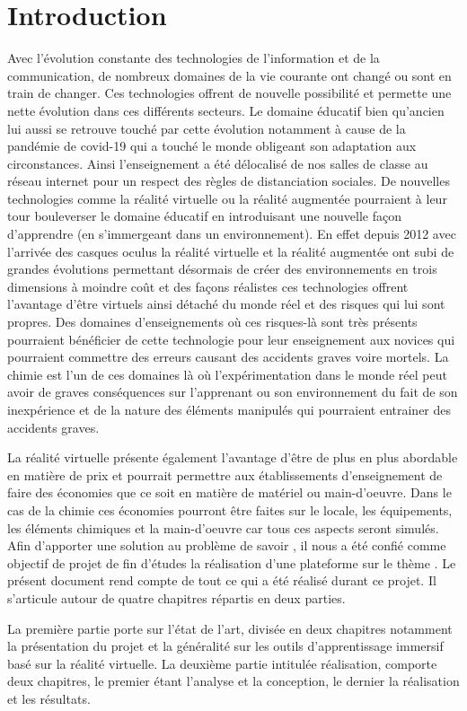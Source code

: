 \chapter*{Introduction}         %

Avec l'évolution constante des technologies de l'information et de la communication, de nombreux domaines de la vie courante ont changé ou sont en train de changer.
Ces technologies offrent de nouvelle possibilité et permette une nette évolution dans ces différents secteurs.
Le domaine éducatif bien qu'ancien lui aussi se retrouve touché par cette évolution notamment à cause de la pandémie de covid-19 qui a touché le monde obligeant son adaptation aux circonstances. Ainsi l'enseignement a été délocalisé de nos salles de classe au réseau internet pour un respect des règles de distanciation sociales.
De nouvelles technologies comme la réalité virtuelle ou la réalité augmentée pourraient à leur tour bouleverser le domaine éducatif en introduisant une nouvelle façon d'apprendre (en s'immergeant dans un environnement).
En effet depuis 2012 avec l'arrivée des casques oculus la réalité virtuelle et la réalité augmentée ont subi de grandes évolutions permettant désormais de créer des environnements en trois dimensions à moindre coût et des façons réalistes ces technologies offrent l'avantage d'être virtuels ainsi détaché du monde réel et des risques qui lui sont propres.
Des domaines d'enseignements où ces risques-là sont très présents pourraient bénéficier de cette technologie pour leur enseignement aux novices qui pourraient commettre des erreurs causant des accidents graves voire mortels.
La chimie est l'un de ces domaines là où l'expérimentation dans le monde réel peut avoir de graves conséquences sur l'apprenant ou son environnement du fait de son inexpérience et de la nature des éléments manipulés qui pourraient entrainer des accidents graves.

La réalité virtuelle présente également l'avantage d'être de plus en plus abordable en matière de prix et pourrait permettre aux établissements d'enseignement de faire des économies que ce soit en matière de matériel ou main-d'oeuvre.
Dans le cas de la chimie ces économies pourront être faites sur le locale, les équipements, les éléments chimiques et la main-d'oeuvre car tous ces aspects seront simulés.
Afin d'apporter une solution au problème de savoir \og \pb \fg, il nous a été confié comme objectif de projet de fin d'études la réalisation d'une plateforme sur le thème \og \theme \fg.
Le présent document rend compte de tout ce qui a été réalisé durant ce projet. Il s’articule autour de quatre chapitres répartis en deux parties.

La première partie porte sur l’état de l’art, divisée en deux chapitres notamment la présentation du projet et la généralité sur les outils d'apprentissage immersif basé sur la réalité virtuelle.
La deuxième partie intitulée réalisation, comporte deux chapitres, le premier étant l’analyse et la conception, le dernier la réalisation et les résultats.

